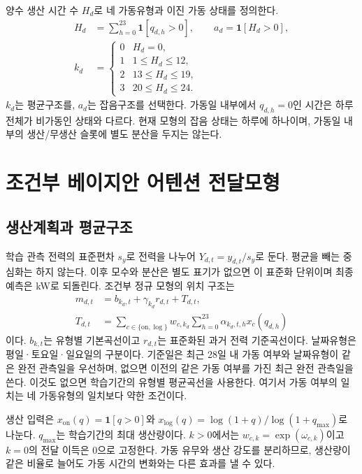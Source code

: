 \documentclass[letterpaper]{article}
\begin{document}
양수 생산 시간 수 $H_d$로 네 가동유형과 이진 가동 상태를 정의한다.
\begin{equation}
\begin{split}
H_d&=\sum_{h=0}^{23}\mathbf{1}[q_{d,h}>0],\qquad a_d=\mathbf{1}[H_d>0],\\
k_d&=\begin{cases}0&H_d=0,\\1&1\le H_d\le12,\\2&13\le H_d\le19,\\3&20\le H_d\le24.\end{cases}
\end{split}
\label{eq:state}
\end{equation}
$k_d$는 평균구조를, $a_d$는 잡음구조를 선택한다. 가동일 내부에서 $q_{d,h}=0$인 시간은 하루 전체가 비가동인 상태와 다르다. 현재 모형의 잡음 상태는 하루에 하나이며, 가동일 내부의 생산/무생산 슬롯에 별도 분산을 두지는 않는다.

\section{조건부 베이지안 어텐션 전달모형}
\subsection{생산계획과 평균구조}
학습 관측 전력의 표준편차 $s_y$로 전력을 나누어 $Y_{d,t}=y_{d,t}/s_y$로 둔다. 평균을 빼는 중심화는 하지 않는다. 이후 모수와 분산은 별도 표기가 없으면 이 표준화 단위이며 최종 예측은 kW로 되돌린다. 조건부 정규 모형의 위치 구조는
\begin{equation}
\begin{split}
m_{d,t}&=b_{k_d,t}+\gamma_{k_d}r_{d,t}+T_{d,t},\\
T_{d,t}&=\sum_{c\in\{\mathrm{on},\log\}}w_{c,k_d}
                \sum_{h=0}^{23}\alpha_{k_d,t,h}x_c(q_{d,h})
\end{split}
\label{eq:mean}
\end{equation}
이다. $b_{k,t}$는 유형별 기본곡선이고 $r_{d,t}$는 표준화된 과거 전력 기준곡선이다. 날짜유형은 평일·토요일·일요일의 구분이다. 기준일은 최근 28일 내 가동 여부와 날짜유형이 같은 완전 관측일을 우선하며, 없으면 이전의 같은 가동 여부를 가진 최근 완전 관측일을 쓴다. 이것도 없으면 학습기간의 유형별 평균곡선을 사용한다. 여기서 가동 여부의 일치는 네 가동유형의 일치보다 약한 조건이다.

생산 입력은 $x_{\mathrm{on}}(q)=\mathbf{1}[q>0]$와 $x_{\log}(q)=\log(1+q)/\log(1+q_{\max})$로 나눈다. $q_{\max}$는 학습기간의 최대 생산량이다. $k>0$에서는 $w_{c,k}=\exp(\omega_{c,k})$이고 $k=0$의 전달 이득은 0으로 고정한다. 가동 유무와 생산 강도를 분리하므로, 생산량이 같은 비율로 늘어도 가동 시간의 변화와는 다른 효과를 낼 수 있다.
\end{document}
